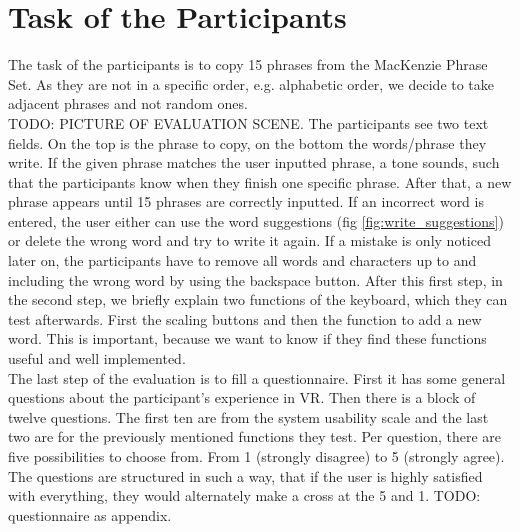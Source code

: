 \section{Task of the Participants}
The task of the participants is to copy 15 phrases from the MacKenzie Phrase Set. As they are not in a specific order, e.g. alphabetic order, we decide to take adjacent phrases and not random ones.\\
TODO: PICTURE OF EVALUATION SCENE.
The participants see two text fields. On the top is the phrase to copy, on the bottom the words/phrase they write. If the given phrase matches the user inputted phrase, a tone sounds, such that the participants know when they finish one specific phrase. After that, a new phrase appears until 15 phrases are correctly inputted. If an incorrect word is entered, the user either can use the word suggestions (fig \ref{fig:write_suggestions}) or delete the wrong word and try to write it again. If a mistake is only noticed later on, the participants have to remove all words and characters up to and including the wrong word by using the backspace button.
\label{sec:eva_task}
After this first step, in the second step, we briefly explain two functions of the keyboard, which they can test afterwards. First the scaling buttons and then the function to add a new word. This is important, because we want to know if they find these functions useful and well implemented.\\
The last step of the evaluation is to fill a questionnaire. First it has some general questions about the participant's experience in VR. Then there is a block of twelve questions. The first ten are from the system usability scale and the last two are for the previously mentioned functions they test. Per question, there are five possibilities to choose from. From 1 (strongly disagree) to 5 (strongly agree). The questions are structured in such a way, that if the user is highly satisfied with everything, they would alternately make a cross at the 5 and 1. TODO: questionnaire as appendix.

